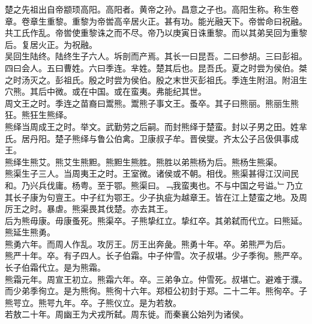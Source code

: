 \documentclass{zhvt-classic}
\begin{document}

\hspace*{2em}楚之先祖出自帝颛顼高阳。高阳者。黄帝之孙。昌意之子也。高阳生称。称生卷章。卷章生重黎。重黎为帝喾高辛居火正。甚有功。能光融天下。帝喾命曰祝融。共工氏作乱。帝喾使重黎诛之而不尽。帝乃以庚寅日诛重黎。而以其弟吴回为重黎后。复居火正。为祝融。\\
\hspace*{2em}吴回生陆终。陆终生子六人。坼剖而产焉。其长一曰昆吾。二曰参胡。三曰彭祖。四曰会人。五曰曹姓。六曰季连。芈姓。楚其后也。昆吾氏。夏之时尝为侯伯。桀之时汤灭之。彭祖氏。殷之时尝为侯伯。殷之末世灭彭祖氏。季连生附沮。附沮生穴熊。其后中微。或在中国。或在蛮夷。弗能纪其世。\\
\hspace*{2em}周文王之时。季连之苗裔曰鬻熊。鬻熊子事文王。蚤卒。其子曰熊丽。熊丽生熊狂。熊狂生熊绎。\\
\hspace*{2em}熊绎当周成王之时。举文。武勤劳之后嗣。而封熊绎于楚蛮。封以子男之田。姓芈氏。居丹阳。楚子熊绎与鲁公伯禽。卫康叔子牟。晋侯燮。齐太公子吕伋俱事成王。\\
\hspace*{2em}熊绎生熊艾。熊艾生熊䵣。熊䵣生熊胜。熊胜以弟熊杨为后。熊杨生熊渠。\\
\hspace*{2em}熊渠生子三人。当周夷王之时。王室微。诸侯或不朝。相伐。熊渠甚得江汉间民和。乃兴兵伐庸。杨粤。至于鄂。熊渠曰。﹁我蛮夷也。不与中国之号谥。﹂乃立其长子康为句亶王。中子红为鄂王。少子执疵为越章王。皆在江上楚蛮之地。及周厉王之时。暴虐。熊渠畏其伐楚。亦去其王。\\
\hspace*{2em}后为熊毋康。毋康蚤死。熊渠卒。子熊挚红立。挚红卒。其弟弑而代立。曰熊延。熊延生熊勇。\\
\hspace*{2em}熊勇六年。而周人作乱。攻厉王。厉王出奔彘。熊勇十年。卒。弟熊严为后。\\
\hspace*{2em}熊严十年。卒。有子四人。长子伯霜。中子仲雪。次子叔堪。少子季徇。熊严卒。长子伯霜代立。是为熊霜。\\
\hspace*{2em}熊霜元年。周宣王初立。熊霜六年。卒。三弟争立。仲雪死。叔堪亡。避难于濮。而少弟季徇立。是为熊徇。熊徇十六年。郑桓公初封于郑。二十二年。熊徇卒。子熊咢立。熊咢九年。卒。子熊仪立。是为若敖。\\
\hspace*{2em}若敖二十年。周幽王为犬戎所弑。周东徙。而秦襄公始列为诸侯。\\
\end{document}
